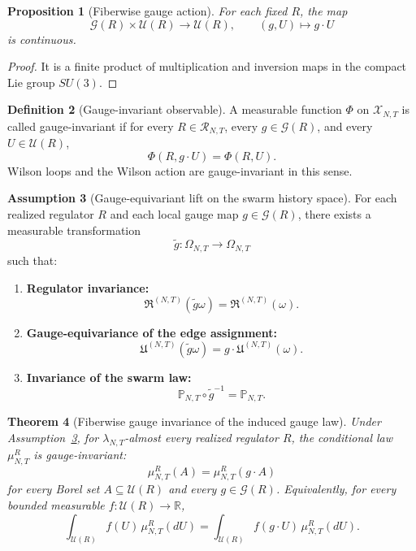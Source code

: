 \documentclass[11pt]{article}
\newtheorem{theorem}{Theorem}[section]
\newtheorem{proposition}[theorem]{Proposition}
\theoremstyle{definition}
\newtheorem{definition}[theorem]{Definition}
\newtheorem{assumption}[theorem]{Assumption}
\theoremstyle{remark}
\newcommand{\R}{\mathbb R}
\begin{document}
\begin{proposition}[Fiberwise gauge action]
\label{prop:fiberwise-gauge-action}
For each fixed \(R\), the map
\[
\mathcal G(R)\times \mathscr U(R)\to \mathscr U(R),\qquad (g,U)\mapsto g\cdot U
\]
is continuous.
\end{proposition}

\begin{proof}
It is a finite product of multiplication and inversion maps in the compact Lie
group \(SU(3)\).
\end{proof}

\begin{definition}[Gauge-invariant observable]
\label{def:gauge-invariant-observable}
A measurable function \(\Phi\) on \(\mathscr X_{N,T}\) is called
gauge-invariant if for every \(R\in\mathscr R_{N,T}\), every
\(g\in\mathcal G(R)\), and every \(U\in\mathscr U(R)\),
\[
\Phi(R,g\cdot U)=\Phi(R,U).
\]
Wilson loops and the Wilson action are gauge-invariant in this sense.
\end{definition}

\begin{assumption}[Gauge-equivariant lift on the swarm history space]
\label{ass:gauge-equivariant-lift}
For each realized regulator \(R\) and each local gauge map
\(g\in\mathcal G(R)\), there exists a measurable transformation
\[
\widetilde g:\Omega_{N,T}\to\Omega_{N,T}
\]
such that:
\begin{enumerate}[leftmargin=1.5em,label=\textnormal{(\roman*)}]
\item \textbf{Regulator invariance:}
\[
\mathfrak R^{(N,T)}(\widetilde g\omega)=\mathfrak R^{(N,T)}(\omega).
\]
\item \textbf{Gauge-equivariance of the edge assignment:}
\[
\mathfrak U^{(N,T)}(\widetilde g\omega)=g\cdot \mathfrak U^{(N,T)}(\omega).
\]
\item \textbf{Invariance of the swarm law:}
\[
\mathbb P_{N,T}\circ \widetilde g^{-1}=\mathbb P_{N,T}.
\]
\end{enumerate}
\end{assumption}

\begin{theorem}[Fiberwise gauge invariance of the induced gauge law]
\label{thm:fiberwise-gauge-invariance}
Under Assumption~\ref{ass:gauge-equivariant-lift}, for
\(\lambda_{N,T}\)-almost every realized regulator \(R\), the conditional law
\(\mu_{N,T}^R\) is gauge-invariant:
\[
\mu_{N,T}^R(A)=\mu_{N,T}^R(g\cdot A)
\]
for every Borel set \(A\subseteq\mathscr U(R)\) and every \(g\in\mathcal G(R)\).
Equivalently, for every bounded measurable \(f:\mathscr U(R)\to\R\),
\[
\int_{\mathscr U(R)}f(U)\,\mu_{N,T}^R(dU)
=
\int_{\mathscr U(R)}f(g\cdot U)\,\mu_{N,T}^R(dU).
\]
\end{theorem}
\end{document}
